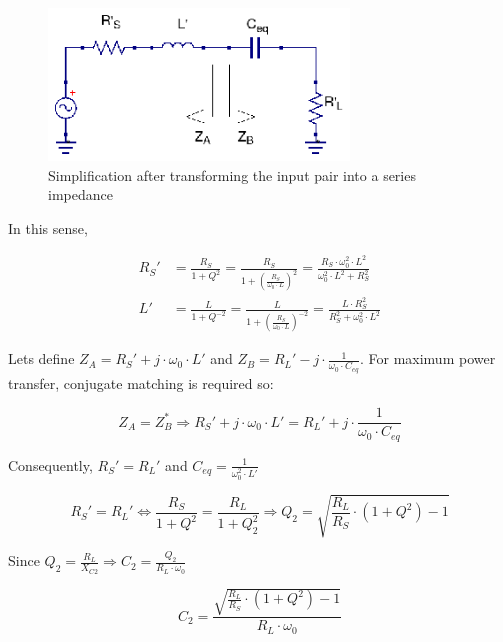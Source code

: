 \begin{figure}[H]
\centering
\includegraphics[width=80mm]{./images/Synthesis/Impedance_Matching/Tapped-C-ckt-equivalent-input-pair-transformed}
\caption{Simplification after transforming the input pair into a series impedance}
\label{fig:tapped-c-simplification-input}
\end{figure}

\noindent In this sense,

\begin{align}
  R_S' &= \frac{R_S}{1 + Q^2} = \frac{R_S}{1 + \left( \frac{R_S}{\omega_0 \cdot L} \right)^2} = \frac{R_S \cdot \omega_0^2 \cdot L^2}{\omega_0^2 \cdot L^2 + R_S^2}\\
  L' &= \frac{L}{1 + Q^{-2}} = \frac{L}{1 + \left( \frac{R_S}{\omega_0 \cdot L}\right)^{-2}} = \frac{L \cdot R_S^2}{R_S^2 + \omega_0^2 \cdot L^2}
\end{align}

\noindent Lets define $Z_A = R_S' + j \cdot \omega_0 \cdot L'$ and $Z_B = R_L' - j \cdot \frac{1}{\omega_0 \cdot C_{eq}}$. For maximum power transfer, conjugate matching is required so:

\begin{equation}
Z_A = Z_B^* \Longrightarrow R_S' + j \cdot \omega_0 \cdot L' = R_L' + j \cdot \frac{1}{\omega_0 \cdot C_{eq}}
\end{equation}

\noindent Consequently, $R_S' = R_L'$ and $C_{eq} = \frac{1}{\omega_0^2 \cdot L'}$

\begin{equation}
R_S' = R_L' \Longleftrightarrow \frac{R_S}{1 + Q^2} = \frac{R_L}{1 + Q_2^2} \Longrightarrow Q_2 = \sqrt{\frac{R_L}{R_S} \cdot (1 + Q^2) - 1}
\end{equation}


\noindent Since $Q_2 = \frac{R_L}{X_{C2}} \Longrightarrow C_2 = \frac{Q_2}{R_L \cdot \omega_0}$

\begin{equation}
C_2 = \frac{\sqrt{\frac{R_L}{R_S} \cdot (1 + Q^2)  - 1 }}{R_L \cdot \omega_0}
\end{equation}

